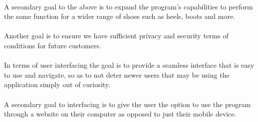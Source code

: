 \documentclass[12pt, titlepage]{article}
\begin{document}
\paragraph{} A secondary goal to the above is to expand the program's capabilities to perform the same function for a wider range of shoes such as heels, boots and more.

\paragraph{} Another goal is to ensure we have sufficient privacy and security terms of conditions for future customers.

\paragraph{} In terms of user interfacing the goal is to provide a seamless interface that is easy to use and navigate, so as to not deter newer users that may be using the application simply out of curiosity.

\paragraph{} A secondary goal to interfacing is to give the user the option to use the program through a website on their computer as opposed to just their mobile device.
\end{document}
